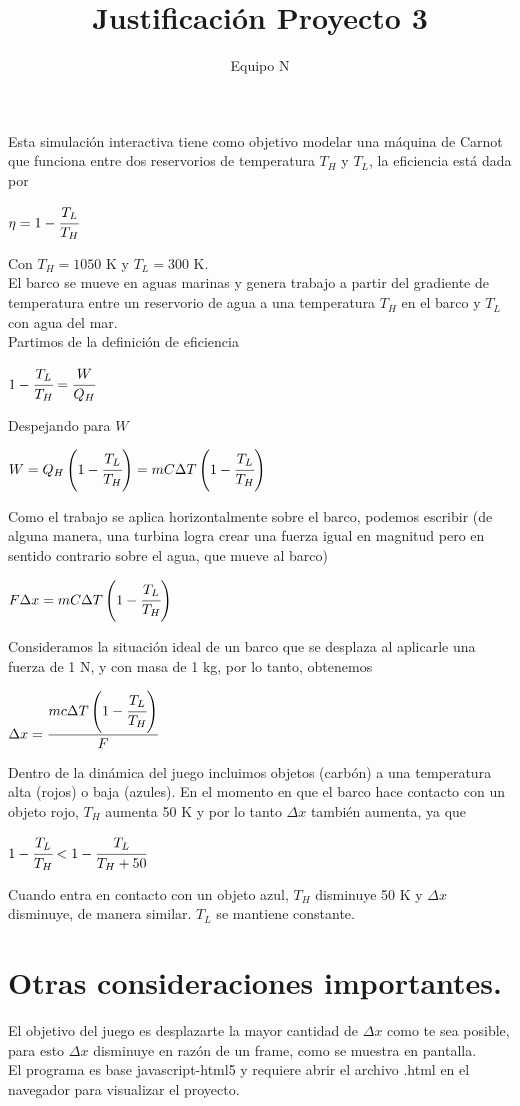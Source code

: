 \documentclass{article}
\title{Justificación Proyecto 3}
\author{Equipo N}
\begin{document}
  \maketitle
  Esta simulación interactiva tiene como objetivo modelar una máquina de Carnot que funciona entre dos reservorios de temperatura $T_H$ y $T_L$, 
  la eficiencia está dada por
  \begin{center}
    $\eta = 1 - \cfrac{T_L}{T_H}$
  \end{center}
  Con $T_H = 1050$ K y $T_L = 300$ K.\\
  El barco se mueve en aguas marinas y genera trabajo a partir del gradiente de temperatura entre un reservorio de agua a una temperatura $T_H$ 
  en el barco y $T_L$ con agua del mar.\\
  Partimos de la definición de eficiencia
  \begin{center}
    $1 - \cfrac{T_L}{T_H} = \cfrac{W}{Q_H}$
  \end{center}
  Despejando para $W$
  \begin{center}
    $W = Q_H\left(1 - \cfrac{T_L}{T_H}\right) = mC\Delta T\left(1 - \cfrac{T_L}{T_H}\right)$
  \end{center}
  Como el trabajo se aplica horizontalmente sobre el barco, podemos escribir (de alguna manera, una turbina logra crear una fuerza igual en magnitud
  pero en sentido contrario sobre el agua, que mueve al barco)
  \begin{center}
    $F\Delta x = mC\Delta T\left(1 - \cfrac{T_L}{T_H}\right)$
  \end{center}
  Consideramos la situación ideal de un barco que se desplaza al aplicarle una fuerza de 1 N, y con masa de 1 kg, por lo tanto, obtenemos
  \begin{center}
    $\Delta x = \cfrac{mc\Delta T\left(1 - \cfrac{T_L}{T_H}\right)}{F}$
  \end{center}
  Dentro de la dinámica del juego incluimos objetos (carbón) a una temperatura alta (rojos) o baja (azules). En el momento en que el barco hace 
  contacto con un objeto rojo, $T_H$ aumenta 50 K y por lo tanto $\Delta x$ también aumenta, ya que
  \begin{center}
    $1 - \cfrac{T_L}{T_H} < 1 - \cfrac{T_L}{T_H + 50}$
  \end{center}
  Cuando entra en contacto con un objeto azul, $T_H$ disminuye 50 K y $\Delta x$ disminuye, de manera similar. $T_L$ se mantiene constante.

  \section*{Otras consideraciones importantes.}
  El objetivo del juego es desplazarte la mayor cantidad de $\Delta x$ como te sea posible, para esto $\Delta x$ disminuye en razón de un frame, 
  como se muestra en pantalla.\\
  El programa es base javascript-html5 y requiere abrir el archivo .html en el navegador para visualizar el proyecto.
\end{document}
